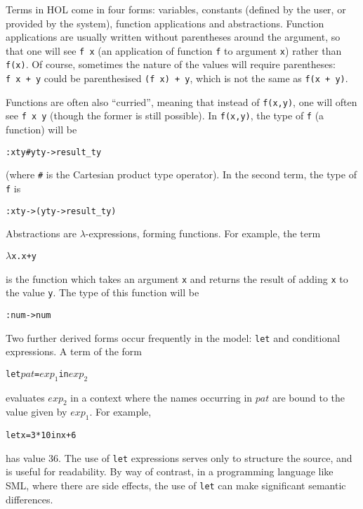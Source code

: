 \documentclass[11pt]{article}
\begin{document}
Terms in HOL come in four forms: variables, constants (defined by the
user, or provided by the system), function applications and
abstractions.  Function applications are usually written without
parentheses around the argument, so that one will see \texttt{f~x} (an
application of function \texttt{f} to argument \texttt{x}) rather than
\texttt{f(x)}.  Of course, sometimes the nature of the values will
require parentheses: \texttt{f~x~+~y} could be parenthesised
\texttt{(f~x)~+~y}, which is not the same as \texttt{f(x~+~y)}.

Functions are often also ``curried'', meaning that instead of
\texttt{f(x,y)}, one will often see \texttt{f~x~y} (though the former
is still possible).  In \texttt{f(x,y)}, the type of \texttt{f} (a
function) will be
\begin{alltt}
   :xty # yty -> result\_ty
\end{alltt}
(where \texttt{\#} is the Cartesian product type operator).  In the
second term, the type of \texttt{f} is
\begin{alltt}
   :xty -> (yty -> result\_ty)
\end{alltt}

\noindent
Abstractions are $\lambda$-expressions, forming functions.  For
example, the term
\begin{alltt}
   \(\lambda\)x. x + y
\end{alltt}
is the function which takes an argument \texttt{x} and returns the
result of adding \texttt{x} to the value \texttt{y}.  The type of this
function will be
\begin{alltt}
   :num -> num
\end{alltt}

\vspace{1ex}
\noindent Two further derived forms occur frequently in the \cpp{}
model: \texttt{let} and conditional expressions.
%
%
A term of the form
\begin{alltt}
   let \(\mathit{pat}\) = \(\mathit{exp}_1\) in \(\mathit{exp}_2\)
\end{alltt}
evaluates $\mathit{exp}_2$ in a context where the names occurring in
$\mathit{pat}$ are bound to the value given by $\mathit{exp}_1$.  For
example,
\begin{alltt}
   let x = 3 * 10 in x + 6
\end{alltt}
has value 36.  The use of \texttt{let} expressions serves only to
structure the source, and is useful for readability.  By way of
contrast, in a programming language like SML, where there are side
effects, the use of \texttt{let} can make significant semantic
differences.
\end{document}

